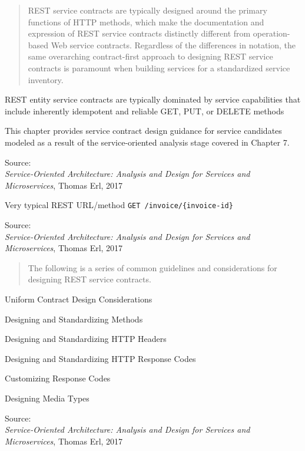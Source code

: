 \documentclass[Screen16to9,17pt]{foils}
\begin{document}


\begin{quote}
REST service contracts are typically designed around the primary functions of HTTP methods, which make the documentation and expression of REST service contracts distinctly different from operation-based Web service contracts. Regardless of the differences in notation, the same overarching contract-first approach to designing REST service contracts is paramount when building services for a standardized service inventory.
\end{quote}

\begin{list2}
\item REST entity service contracts are typically dominated by service capabilities that include inherently idempotent and reliable GET, PUT, or DELETE methods
\item This chapter provides service contract design guidance for service candidates modeled as a result of the service-oriented analysis stage covered in Chapter 7.
\end{list2}
Source: {\footnotesize\\
\emph{Service‑Oriented Architecture: Analysis and Design for Services and Microservices}, Thomas Erl, 2017}







\begin{list2}
\item Very typical REST URL/method \verb+GET /invoice/{invoice-id}+
\end{list2}
Source: {\footnotesize\\
\emph{Service‑Oriented Architecture: Analysis and Design for Services and Microservices}, Thomas Erl, 2017}



\slide{}


\begin{quote}
The following is a series of common guidelines and considerations for designing REST service contracts.
\end{quote}


\begin{list2}
\item Uniform Contract Design Considerations
\item Designing and Standardizing Methods
\item Designing and Standardizing HTTP Headers
\item Designing and Standardizing HTTP Response Codes
\item Customizing Response Codes
\item Designing Media Types
\end{list2}
Source: {\footnotesize\\
\emph{Service‑Oriented Architecture: Analysis and Design for Services and Microservices}, Thomas Erl, 2017}
\end{document}
